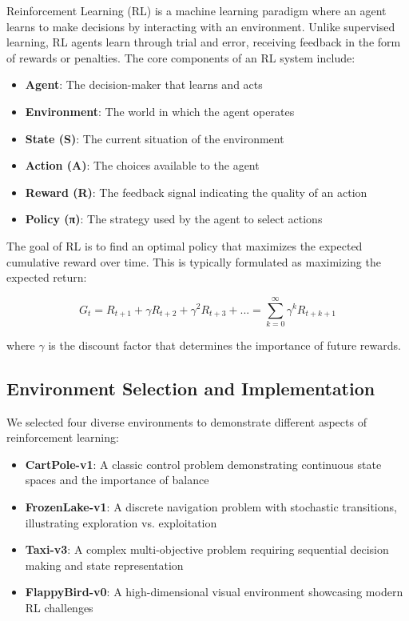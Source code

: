 \documentclass[12pt]{article}
\begin{document}
{{{Reinforcement Learning (RL) is a machine learning paradigm where an agent learns to make decisions by interacting with an environment. Unlike supervised learning, RL agents learn through trial and error, receiving feedback in the form of rewards or penalties. The core components of an RL system include:

\begin{itemize}
    \item \textbf{Agent}: The decision-maker that learns and acts
    \item \textbf{Environment}: The world in which the agent operates
    \item \textbf{State (S)}: The current situation of the environment
    \item \textbf{Action (A)}: The choices available to the agent
    \item \textbf{Reward (R)}: The feedback signal indicating the quality of an action
    \item \textbf{Policy (π)}: The strategy used by the agent to select actions
\end{itemize}

The goal of RL is to find an optimal policy that maximizes the expected cumulative reward over time. This is typically formulated as maximizing the expected return:

\begin{equation}
G_t = R_{t+1} + \gamma R_{t+2} + \gamma^2 R_{t+3} + ... = \sum_{k=0}^{\infty} \gamma^k R_{t+k+1}
\end{equation}

where $\gamma$ is the discount factor that determines the importance of future rewards.

\subsection{Environment Selection and Implementation}

We selected four diverse environments to demonstrate different aspects of reinforcement learning:

\begin{itemize}
    \item \textbf{CartPole-v1}: A classic control problem demonstrating continuous state spaces and the importance of balance
    \item \textbf{FrozenLake-v1}: A discrete navigation problem with stochastic transitions, illustrating exploration vs. exploitation
    \item \textbf{Taxi-v3}: A complex multi-objective problem requiring sequential decision making and state representation
    \item \textbf{FlappyBird-v0}: A high-dimensional visual environment showcasing modern RL challenges
\end{itemize}

}}}
\end{document}
